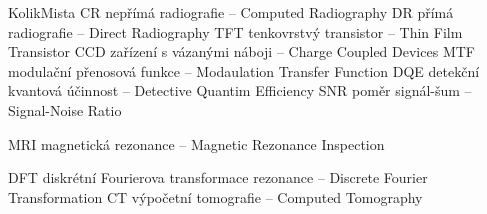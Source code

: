 \begin{seznamzkratek}{KolikMista}
			{CR}
			{nepřímá radiografie -- Computed Radiography}
			{DR}
			{přímá radiografie -- Direct Radiography}
			{TFT}
			{tenkovrstvý transistor -- Thin Film Transistor}
			{CCD}
			{zařízení s vázanými náboji -- Charge Coupled Devices}
			{MTF}
			{modulační přenosová funkce -- Modaulation Transfer Function}
			{DQE}
			{detekční kvantová účinnost -- Detective Quantim Efficiency}
			{SNR}
			{poměr signál-šum -- Signal-Noise Ratio}

			{MRI}
			{magnetická rezonance -- Magnetic Rezonance Inspection}
			
			{DFT}
			{diskrétní Fourierova transformace rezonance -- Discrete Fourier Transformation}
			{CT}
			{výpočetní tomografie -- Computed Tomography}
\end{seznamzkratek}
